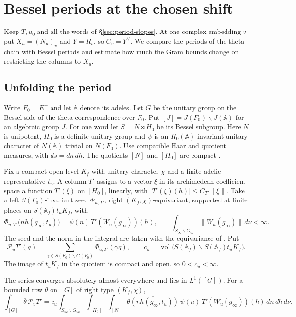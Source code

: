 \section{Bessel periods at the chosen shift}\label{sec:bessel-periods}

Keep $T,u_0$ and all the words of \S\ref{sec:period-slopes}. At one
complex embedding $v$ put $X_u=(N_u)_v$ and $Y=R_v$, so $C_v=Y^\vee$.
We compare the periods of the theta chain with Bessel periods and
estimate how much the Gram bounds change on restricting the columns
to $X_u$.

\subsection{Unfolding the period}

Write $F_0=E^+$ and let $\mathbb A$ denote its adeles. Let $G$ be the
unitary group on the Bessel side of the theta correspondence over $F_0$.
Put $[J]=J(F_0)\backslash J(\mathbb A)$ for an algebraic group $J$.
For one word let $S=N\rtimes H_0$ be its Bessel
subgroup. Here $N$ is unipotent, $H_0$ is a definite unitary group
and $\psi$ is an $H_0(\mathbb A)$-invariant unitary character of
$N(\mathbb A)$ trivial on $N(F_0)$. Use compatible Haar and quotient
measures, with $ds=dn\,dh$. The quotients $[N]$ and $[H_0]$ are compact
\citep[Lemma~14.4]{adriazola-grh}.

Fix a compact open level $K_f$ with unitary character $\chi$ and a
finite adelic representative $t_u$. A column $T'$ assigns to a vector
$\xi$ in its archimedean coefficient space a function $T'(\xi)$ on
$[H_0]$, linearly, with $|T'(\xi)(h)|\le C_{T'}\|\xi\|$.
Take a left $S(F_0)$-invariant seed $\Phi_{u,T'}$, right
$(K_f,\chi)$-equivariant, supported at finite places on
$S(\mathbb A_f)t_uK_f$, with
\[
 \Phi_{u,T'}\bigl(nh(g_\infty,t_u)\bigr)
      =\psi(n)\,T'(W_u(g_\infty))(h),\qquad
 \int_{S_\infty\backslash G_\infty}\|W_u(g_\infty)\|\,d\nu<\infty .
\]
The seed and the norm in the integral are taken with the equivariance
of \citep[\S14.2.1]{adriazola-grh}. Put
\[
 \mathcal P_uT'(g)=\sum_{\gamma\in S(F_0)\backslash G(F_0)}
                         \Phi_{u,T'}(\gamma g),\qquad
 c_u=\operatorname{vol}\bigl(S(\mathbb A_f)\backslash
                                      S(\mathbb A_f)t_uK_f\bigr).
\]
The image of $t_uK_f$ in the quotient is compact and open, so
$0<c_u<\infty$.

\begin{lemma}\label{lem:bessel-unfold}
The series converges absolutely almost everywhere and lies in $L^1([G])$.
For a bounded row $\theta$ on $[G]$ of right type $(K_f,\chi)$,
\begin{equation}\label{eq:bessel-unfold}
 \int_{[G]}\overline{\theta}\,\mathcal P_u T'
 =c_u\int_{S_\infty\backslash G_\infty}\int_{[H_0]}\int_{[N]}
     \overline{\theta(nh(g_\infty,t_u))}
     \,\psi(n)\,T'(W_u(g_\infty))(h)\,dn\,dh\,d\nu .
\end{equation}
\end{lemma}

